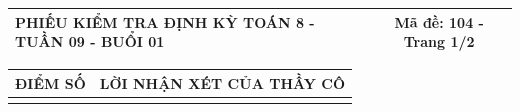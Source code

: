 \documentclass[12pt,a4paper]{article}
\begin{document}
\newpage
\noindent
\begin{tabularx}{\linewidth}{|X|c|}
\hline
\textbf{PHIẾU KIỂM TRA ĐỊNH KỲ TOÁN 8 - TUẦN 09 - BUỔI 01} & \textbf{Mã đề: 104 - Trang 1/2} \\
\hline
\end{tabularx}

\vspace{1.2mm}

\noindent
\begin{tabularx}{\linewidth}{|p{3.2cm}|X|}
\hline
\centering\textbf{ĐIỂM SỐ} & \centering\textbf{LỜI NHẬN XÉT CỦA THẦY CÔ} \tabularnewline
\hline
\rule{0pt}{1.8cm} & \tabularnewline
\hline
\end{tabularx}
\end{document}
